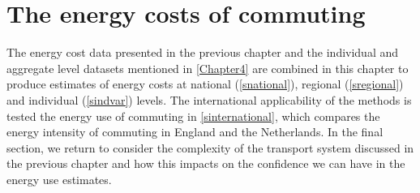
\chapter{The energy costs of commuting}
\label{Chapter6}
The energy cost data presented in the previous chapter and the
individual and aggregate level datasets mentioned in
\cref{Chapter4} are combined in this chapter to produce estimates of
energy costs at national (\cref{snational}), regional (\cref{sregional}) and
individual (\cref{sindvar}) levels. The international applicability of the
methods is tested the energy use of commuting in \cref{sinternational}, which
compares the energy intensity of commuting in England and the Netherlands.
% 
In the final section, we return to consider the complexity of the transport
system discussed in the previous chapter and how this impacts on the
confidence we can have in the energy use estimates.



